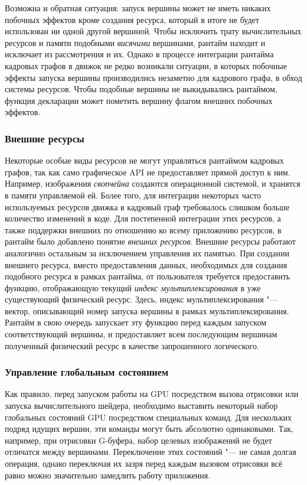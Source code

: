 Возможна и обратная ситуация: запуск вершины может не иметь никаких побочных эффектов кроме создания ресурса, который в итоге не будет использован ни одной другой вершиной.
Чтобы исключить трату вычислительных ресурсов и памяти подобными \textit{висячими} вершинами, рантайм находит и исключает из рассмотрения и их.
Однако в процессе интеграции рантайма кадровых графов в движок не редко возникали ситуации, в которых побочные эффекты запуска вершины производились незаметно для кадрового графа, в обход системы ресурсов.
Чтобы подобные вершины не выкидывались рантаймом, функция декларации может пометить вершину флагом внешних побочных эффектов.

\subsubsection{Внешние ресурсы}
Некоторые особые виды ресурсов не могут управляться рантаймом кадровых графов, так как само графическое API не предоставляет прямой доступ к ним.
Например, изображения \textit{свопчейна} создаются операционной системой, и хранятся в памяти управляемой ей.
Более того, для интеграции некоторых часто используемых ресурсов движка в кадровый граф требовалось слишком больше количество изменений в коде.
Для постепенной интеграции этих ресурсов, а также поддержки внешних по отношению ко всему приложению ресурсов, в рантайм было добавлено понятие \textit{внешних ресурсов}.
Внешние ресурсы работают аналогично остальным за исключением управления их памятью.
При создании внешнего ресурса, вместо предоставления данных, необходимых для создания подобного ресурса в рамках рантайма, от пользователя требуется предоставить функцию, отображающую текущий \textit{индекс мультиплексирования} в уже существующий физический ресурс.
Здесь, индекс мультиплексирования "--- вектор, описывающий номер запуска вершины в рамках мультиплексирования.
Рантайм в свою очередь запускает эту функцию перед каждым запуском соответствующий вершины, и предоставляет всем последующим вершинам полученный физический ресурс в качестве запрошенного логического.

\subsubsection{Управление глобальным состоянием}
Как правило, перед запуском работы на GPU посредством вызова отрисовки или запуска вычислительного шейдера, необходимо выставить некоторый набор глобальных состояний GPU посредством специальных команд.
Для нескольких подряд идущих вершин, эти команды могут быть абсолютно одинаковыми.
Так, например, при отрисовки G-буфера, набор целевых изображений не будет отличатся между вершинами.
Переключение этих состояний "--- не самая долгая операция, однако переключая их зазря перед каждым вызовом отрисовки всё равно можно значительно замедлить работу приложения.

